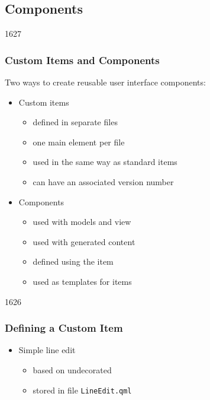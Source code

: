 %
%
%
%

\subsection{Components}

\begin{slide}{1627}\frametitle{Custom Items and Components}

Two ways to create reusable user interface components:

\begin{itemize}
\item Custom items
  \begin{itemize}
  \item defined in separate files
  \item one main element per file
  \item used in the same way as standard items
  \item can have an associated version number
  \end{itemize}
\item Components
  \begin{itemize}
  \item used with models and view
  \item used with generated content
  \item defined using the  item
  \item used as templates for items
  \end{itemize}
\end{itemize}

\end{slide}


\begin{slide}{1626}\frametitle{Defining a Custom Item}


\begin{itemize}
\item Simple line edit
  \begin{itemize}
  \item based on undecorated 
  \item stored in file \texttt{LineEdit.qml}
  \end{itemize}
\end{itemize}


\end{slide}

